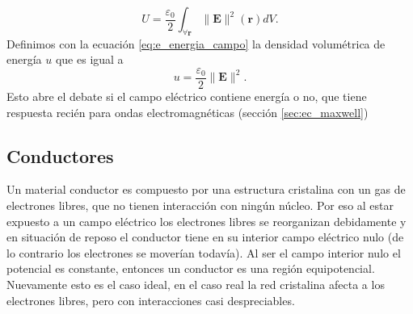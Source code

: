 \documentclass[11pt,a4paper]{article}
\numberwithin{equation}{section}
\begin{document}
\begin{equation}
    U = \frac{\varepsilon_0}{2}\int_{\forall \textbf{r}} \|\textbf{E}\|^2(\textbf{r}) dV.
    \label{eq:e_energia_campo}
\end{equation}
Definimos con la ecuación \ref{eq:e_energia_campo} la densidad volumétrica de energía $u$ que es igual a
\begin{equation}
    u = \frac{\varepsilon_0}{2} \|\textbf{E}\|^2.
    \label{eq:e_energia_densidad}
\end{equation}
Esto abre el debate si el campo eléctrico contiene energía o no, que tiene respuesta recién para ondas electromagnéticas (sección \ref{sec:ec_maxwell})

\subsection{Conductores}
Un material conductor es compuesto por una estructura cristalina con un gas de electrones libres, que no tienen interacción con ningún núcleo. Por eso al estar expuesto a un campo eléctrico los electrones libres se reorganizan debidamente y en situación de reposo el conductor tiene en su interior campo eléctrico nulo (de lo contrario los electrones se moverían todavía). Al ser el campo interior nulo el potencial es constante, entonces un conductor es una región equipotencial. Nuevamente esto es el caso ideal, en el caso real la red cristalina afecta a los electrones libres, pero con interacciones casi despreciables. 
\end{document}
